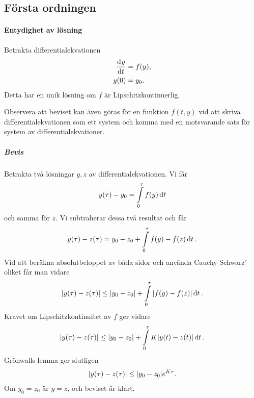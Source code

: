 \subsection{Första ordningen}

\paragraph{Entydighet av lösning}
Betrakta differentialekvationen
\begin{align*}
	\dv[]{y}{t} (t) &= f(y), \\
	y(0)            &= y_0.
\end{align*}
Detta har en unik lösning om $f$ är Lipschitzkontinuerlig.

Observera att beviset kan även göras för en funktion $f(t, y)$ vid att skriva differentialekvationen som ett system och komma med en motsvarande sats för system av differentialekvationer.

\subparagraph{Bevis}
Betrakta två lösningar $y, z$ av differentialekvationen. Vi får
\begin{align*}
	y(\tau) - y_{0} = \int\limits_{0}^{\tau}f(y)\dd{t}
\end{align*}
och samma för $z$. Vi subtraherar dessa två resultat och får
\begin{align*}
	y(\tau) - z(\tau) = y_{0} - z_{0} + \int\limits_{0}^{\tau}f(y) - f(z)\dd{t}.
\end{align*}
Vid att beräkna absolutbeloppet av båda sidor och använda Cauchy-Schwarz' oliket får man vidare
\begin{align*}
	\abs{y(\tau) - z(\tau)} \leq \abs{y_{0} - z_{0}} + \int\limits_{0}^{\tau}\abs{f(y) - f(z)}\dd{t}.
\end{align*}
Kravet om Lipschitzkontinuitet av $f$ ger vidare
\begin{align*}
	\abs{y(\tau) - z(\tau)} \leq \abs{y_{0} - z_{0}} + \int\limits_{0}^{\tau}K\abs{y(t) - z(t)}\dd{t}.
\end{align*}
Grönwalls lemma ger slutligen
\begin{align*}
	\abs{y(\tau) - z(\tau)} \leq \abs{y_{0} - z_{0}}e^{K\tau}.
\end{align*}
Om $y_{0} = z_{0}$ är $y = z$, och beviset är klart.

